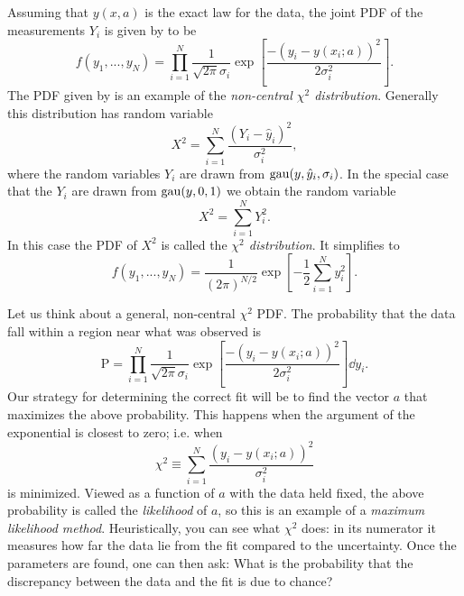 Assuming that $y(x,a)$ is the exact law for the data, the joint PDF
of the measurements $Y_i$ is given by  to be
\begin{equation}\label{eq:chi2NC}
  f(y_1,...,y_N)=\prod_{i=1}^N\frac{1}{\sqrt{2\pi}\sigma_i}
      \exp\left[\frac{-(y_i-y(x_i;a))^2}{2\sigma_i^2}\right].
\end{equation}
The PDF given by  is an example of the 
{\it non-central $\chi^2$ distribution}. Generally this distribution
has random variable
\begin{equation}
  X^2=\sum_{i=1}^N\frac{(Y_i-\hat{y}_i)^2}{\sigma_i^2},
\end{equation}
where the random variables $Y_i$ are drawn from $\operatorname{gau}(y,\hat{y}_i,\sigma_i)$. 
In the special case that the $Y_i$ are drawn from $\operatorname{gau}(y,0,1)$ we
obtain the random variable
\begin{equation}
  X^2=\sum\limits_{i=1}^NY_i^2.
\end{equation}
In this case the PDF of $X^2$ is called the {\it $\chi^2$ distribution}. 
 It simplifies to 
\begin{equation}\label{eq:chi2dist}
  f(y_1,...,y_N)=\frac{1}{(2\pi)^{N/2}}
      \exp\left[-\frac{1}{2}\sum_{i=1}^Ny_i^2\right].
\end{equation}

Let us think about a general, non-central $\chi^2$ PDF. The probability that the
data fall within a region near what was observed is 
\begin{equation}
  \text{P}=\prod_{i=1}^N\frac{1}{\sqrt{2\pi}\sigma_i}
      \exp\left[\frac{-(y_i-y(x_i;a))^2}{2\sigma_i^2}\right]\dd{y_i}.
\end{equation}
Our strategy for determining the correct fit will be to find the vector $a$
that maximizes the above probability. This happens when the argument
of the exponential is closest to zero; i.e. when
\begin{equation}
  \chi^2\equiv\sum_{i=1}^N\frac{(y_i-y(x_i;a))^2}{\sigma_i^2}
\end{equation}
is minimized. Viewed as a function of $a$ with the data held fixed, the above
probability is called the {\it likelihood} of $a$, so this is an
example of a {\it maximum likelihood method}.
Heuristically, you can see what $\chi^2$ does: in its numerator it measures how
far the data lie from the fit compared to the uncertainty.
Once the parameters are found, one can then ask: What is the probability
that the discrepancy between the data and the fit is due to chance? 

